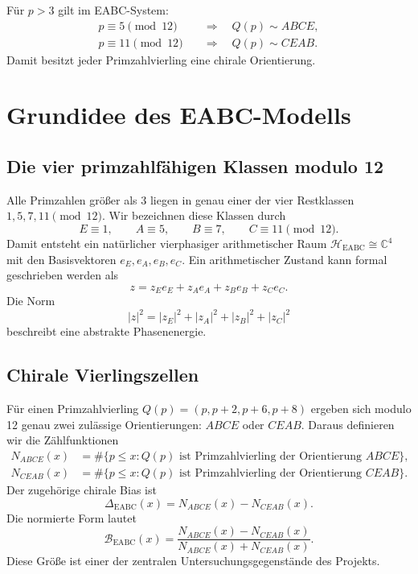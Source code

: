 \documentclass[11pt,a4paper,bibliography=totoc]{scrartcl}
\begin{document}
Für $p > 3$ gilt im EABC-System:
\begin{align*}
p \equiv 5 \pmod{12} \quad &\Rightarrow \quad Q(p) \sim ABCE, \\
p \equiv 11 \pmod{12} \quad &\Rightarrow \quad Q(p) \sim CEAB.
\end{align*}
Damit besitzt jeder Primzahlvierling eine chirale Orientierung.

\section{Grundidee des EABC-Modells}

\subsection{Die vier primzahlfähigen Klassen modulo 12}
Alle Primzahlen größer als 3 liegen in genau einer der vier Restklassen $1, 5, 7, 11 \pmod{12}$. Wir bezeichnen diese Klassen durch
\[
E \equiv 1, \qquad A \equiv 5, \qquad B \equiv 7, \qquad C \equiv 11 \pmod{12}.
\]
Damit entsteht ein natürlicher vierphasiger arithmetischer Raum $\mathcal{H}_{\mathrm{EABC}} \cong \mathbb{C}^4$ mit den Basisvektoren $e_E, e_A, e_B, e_C$. Ein arithmetischer Zustand kann formal geschrieben werden als
\[
z = z_E e_E + z_A e_A + z_B e_B + z_C e_C.
\]
Die Norm
\[
|z|^2 = |z_E|^2 + |z_A|^2 + |z_B|^2 + |z_C|^2
\]
beschreibt eine abstrakte Phasenenergie.

\subsection{Chirale Vierlingszellen}
Für einen Primzahlvierling $Q(p) = (p, p+2, p+6, p+8)$ ergeben sich modulo 12 genau zwei zulässige Orientierungen: $ABCE$ oder $CEAB$. Daraus definieren wir die Zählfunktionen
\begin{align*}
N_{ABCE}(x) &= \# \{p \leq x : Q(p) \text{ ist Primzahlvierling der Orientierung } ABCE\}, \\
N_{CEAB}(x) &= \# \{p \leq x : Q(p) \text{ ist Primzahlvierling der Orientierung } CEAB\}.
\end{align*}
Der zugehörige chirale Bias ist
\[
\Delta_{\mathrm{EABC}}(x) = N_{ABCE}(x) - N_{CEAB}(x).
\]
Die normierte Form lautet
\[
\mathcal{B}_{\mathrm{EABC}}(x) = \frac{N_{ABCE}(x) - N_{CEAB}(x)}{N_{ABCE}(x) + N_{CEAB}(x)}.
\]
Diese Größe ist einer der zentralen Untersuchungsgegenstände des Projekts.
\end{document}
